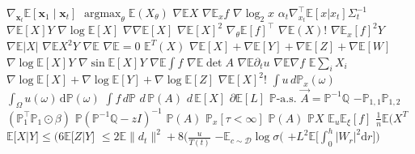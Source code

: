 \documentclass{article}
\begin{document}
$\nabla_{\mathbf x_t}\mathbb{E}[\mathbf x_1\mid\mathbf x_t]$ $\operatorname*{argmax}_\theta\mathbb{E}(X_\theta)$ $\nabla\mathbb{E}X$
$\nabla\mathbb{E}_x f$ $\nabla\log_2 x$ $\alpha_t\nabla^{\top}_{x_t}\mathbb{E}[x|x_t]\Sigma_t^{-1}$ $\nabla\mathbb{E}[X]Y$
$\nabla\log\mathbb{E}[X]$ $\nabla\nabla\mathbb{E}[X]$ $\nabla\mathbb{E}[X]^2$ $\nabla_\theta\mathbb{E}[f]^{\top}$ $\nabla\mathbb{E}(X)!$
$\nabla\mathbb{E}_x[f]^2Y$ $\nabla\mathbb{E}|X|$ $\nabla\mathbb{E}X^2Y$ $\nabla\mathbb{E}$ $\nabla\mathbb{E}=0$ $\mathbb{E}^{T}(X)$
$\nabla\mathbb{E}[X]+\nabla\mathbb{E}[Y]+\nabla\mathbb{E}[Z]+\nabla\mathbb{E}[W]$ $\nabla\log\mathbb{E}[X]Y$ $\nabla\sin\mathbb{E}[X]Y$
$\nabla\mathbb{E}\int f$ $\nabla\mathbb{E}\det A$ $\nabla\mathbb{E}\partial_t u$ $\nabla\mathbb{E}\nabla f$ $\mathbb{E}\sum_i X_i$
$\nabla\log\mathbb{E}[X]+\nabla\log\mathbb{E}[Y]+\nabla\log\mathbb{E}[Z]$ $\nabla\mathbb{E}[X]^{2}!$ $\int u\,d\mathbb{P}_x(\omega)$
$\int_\Omega u(\omega)\,\mathrm{d}\mathbb{P}(\omega)$ $\int f\,d\mathbb{P}$ $d\,\mathbb{P}(A)$ $d\,\mathbb{E}[X]$ $\partial\mathbb{E}[L]$
$\mathbb{P}\text{-a.s.}$ $\vec A=\mathbb{P}^{-1}\mathbb{Q}$ $-\mathbb{P}_{1,1}\mathbb{P}_{1,2}$ $(\mathbb{P}_1^\intercal\mathbb{P}_1\odot\beta)$
$\mathbb{P}(\mathbb{P}^{-1}\mathbb{Q}-zI)^{-1}$ $\mathbb{P}(A)$ $\mathbb{P}_x[\tau<\infty]$ $\mathbb{P}\left(A\right)$ $\mathbb{P}X$
$\mathbb{E}_u\mathbb{E}_\xi[f]$
$\frac{1}{n}\mathbb{E}(X^{T}$ $\mathbb{E}\Big[X\Big|Y\Big]\leq\Big(6\mathbb{E}\Big[Z\Big|Y\Big]$ $\leq2\mathbb{E}\|d_{t}\|^{2}+8\Bigg(\frac{u}{T(t)}$
$-\mathbb{E}_{c\sim\mathcal{D}}\log\sigma($ $+L^{2}\mathbb{E}\Big[\int_{0}^{h}|W_{r}|^{2}\mathrm{d}r\Big]\Big)$
\end{document}

